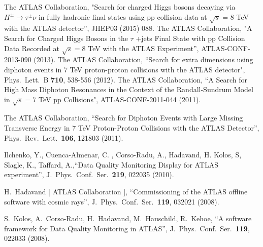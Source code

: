 \documentclass[10pt]{article}
\begin{document}
\begin{thebibliography}{99}

 {} The ATLAS Collaboration, "Search for charged Higgs bosons decaying via $H^{\pm} \rightarrow \tau^{\pm}\nu$ in fully hadronic final states using pp collision data at $\sqrt{s}$ = 8 TeV with the ATLAS detector'', JHEP03 (2015) 088.
 {} The ATLAS Collaboration, "A Search for Charged Higgs Bosons in the $\tau$ +jets Final State with pp Collision Data Recorded at $\sqrt  s = 8$ TeV with the ATLAS Experiment'', ATLAS-CONF-2013-090 (2013).
 {} The ATLAS Collaboration, ``Search for extra dimensions using diphoton events in 7 TeV proton-proton collisions with the ATLAS detector", Phys.\ Lett.\ B {\bf 710}, 538-556 (2012).
 {} The ATLAS Collaboration, ``A Search for High Mass Diphoton Resonances in the Context of the Randall-Sundrum Model in $\sqrt s=7$ TeV pp Collisions", ATLAS-CONF-2011-044 (2011).

 {} The ATLAS Collaboration, ``Search for Diphoton Events with Large Missing Transverse Energy in 7 TeV Proton-Proton Collisions with the ATLAS Detector'', Phys.\ Rev.\ Lett.\  {\bf 106}, 121803 (2011).


 {} Ilchenko, Y., Cuenca-Almenar, C. , Corso-Radu, A., Hadavand, H.  Kolos, S,  Slagle, K.,  Taffard, A.,``Data Quality Monitoring Display for ATLAS experiment'', J.\ Phys.\ Conf.\ Ser.\  {\bf 219}, 022035 (2010).

  H.~Hadavand [ ATLAS Collaboration ],
  ``Commissioning of the ATLAS offline software with cosmic rays'',
  J.\ Phys.\ Conf.\ Ser.\  {\bf 119}, 032021 (2008).

  S.~Kolos, A.~Corso-Radu, H.~Hadavand, M.~Hauschild, R.~Kehoe,
  ``A software framework for Data Quality Monitoring in ATLAS'',
  J.\ Phys.\ Conf.\ Ser.\  {\bf 119}, 022033 (2008).



\end{thebibliography}
\end{document}
